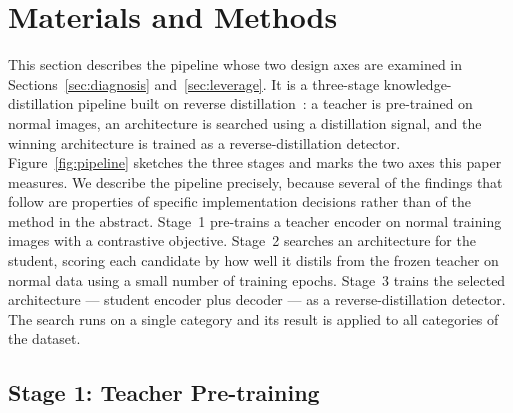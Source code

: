 
\section{Materials and Methods}
\label{sec:method}

This section describes the pipeline whose two design axes are examined in
Sections~\ref{sec:diagnosis} and~\ref{sec:leverage}. It is a three-stage
knowledge-distillation pipeline built on reverse
distillation~\cite{deng2022reverse}: a teacher is pre-trained on normal images,
an architecture is searched using a distillation signal, and the winning
architecture is trained as a reverse-distillation detector.
Figure~\ref{fig:pipeline} sketches the three stages and marks the two axes this
paper measures. We describe the pipeline precisely, because several of the
findings that follow are properties of specific implementation decisions rather
than of the method in the abstract. Stage~1 pre-trains a teacher encoder on normal
training images with a contrastive objective. Stage~2 searches an architecture for
the student, scoring each candidate by how well it distils from the frozen teacher
on normal data using a small number of training epochs. Stage~3 trains the
selected architecture --- student encoder plus decoder --- as a reverse-distillation
detector. The search runs on a single category and its result is applied to all
categories of the dataset.

\subsection{Stage 1: Teacher Pre-training}
\label{subsec:teacher}


